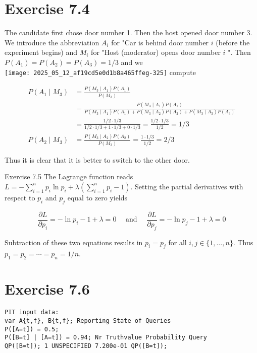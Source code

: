 \documentclass[10pt]{article}
\begin{document}
\section*{Exercise 7.4}
The candidate first chose door number 1. Then the host opened door number 3. We introduce the abbreviation $A_{i}$ for "Car is behind door number $i$ (before the experiment begins) and $M_{i}$ for "Host (moderator) opens door number $i$ ". Then $P\left(A_{1}\right)=P\left(A_{2}\right)=P\left(A_{3}\right)=1 / 3$ and we\\
\texttt{[image: 2025\_05\_12\_af19cd5e0d1b8a465ffeg-325]} compute

$$
\begin{aligned}
P\left(A_{1} \mid M_{3}\right) & =\frac{P\left(M_{3} \mid A_{1}\right) P\left(A_{1}\right)}{P\left(M_{3}\right)} \\
& =\frac{P\left(M_{3} \mid A_{1}\right) P\left(A_{1}\right)}{P\left(M_{3} \mid A_{1}\right) P\left(A_{1}\right)+P\left(M_{3} \mid A_{2}\right) P\left(A_{2}\right)+P\left(M_{3} \mid A_{3}\right) P\left(A_{3}\right)} \\
& =\frac{1 / 2 \cdot 1 / 3}{1 / 2 \cdot 1 / 3+1 \cdot 1 / 3+0 \cdot 1 / 3}=\frac{1 / 2 \cdot 1 / 3}{1 / 2}=1 / 3 \\
P\left(A_{2} \mid M_{3}\right) & =\frac{P\left(M_{3} \mid A_{2}\right) P\left(A_{2}\right)}{P\left(M_{3}\right)}=\frac{1 \cdot 1 / 3}{1 / 2}=2 / 3
\end{aligned}
$$

Thus it is clear that it is better to switch to the other door.

Exercise 7.5 The Lagrange function reads $L=-\sum_{i=1}^{n} p_{i} \ln p_{i}+\lambda\left(\sum_{i=1}^{n} p_{i}-1\right)$. Setting the partial derivatives with respect to $p_{i}$ and $p_{j}$ equal to zero yields

$$
\frac{\partial L}{\partial p_{i}}=-\ln p_{i}-1+\lambda=0 \quad \text { and } \quad \frac{\partial L}{\partial p_{j}}=-\ln p_{j}-1+\lambda=0
$$

Subtraction of these two equations results in $p_{i}=p_{j}$ for all $i, j \in\{1, \ldots, n\}$. Thus $p_{1}=p_{2}=\cdots=p_{n}=1 / n$.

\section*{Exercise 7.6}
\begin{verbatim}
PIT input data:
var A{t,f}, B{t,f}; Reporting State of Queries
P([A=t]) = 0.5;
P([B=t] | [A=t]) = 0.94; Nr Truthvalue Probability Query
QP([B=t]); 1 UNSPECIFIED 7.200e-01 QP([B=t]);
\end{verbatim}
\end{document}

